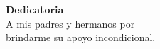 \begin{flushright}
    {\Large \textbf{Dedicatoria}}\\[1cm]
    A mis padres y hermanos por\\ brindarme su apoyo incondicional. \\
\end{flushright}